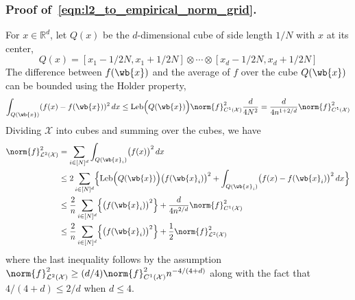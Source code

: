 \documentclass{article}
\newcommand{\Reals}{\mathbb{R}}
\newcommand{\1}{\mathbf{1}}
\newcommand{\Rd}{\Reals^d}
\newcommand{\Xset}{\mathcal{X}}
\newcommand{\Leb}{\mathcal{L}}
\theoremstyle{alden}
\theoremstyle{aldenthm}
\theoremstyle{definition}
\theoremstyle{remark}
\begin{document}
\subsubsection{Proof of~\eqref{eqn:l2_to_empirical_norm_grid}.}
For $x \in \Rd$, let $Q(x)$ be the $d$-dimensional cube of side length $1/N$ with $x$ at its center,
\begin{equation*}
Q(x) = [x_1 - 1/2N,x_1 + 1/2N] \otimes \cdots \otimes [x_d - 1/2N,x_d + 1/2N]
\end{equation*}
The difference between $f(\wb{x})$ and the average of $f$ over the cube $Q(\wb{x})$ can be bounded using the Holder property,
\begin{equation*}
\int_{Q(\wb{x})} (f(x) - f(\wb{x}))^2 \,dx \leq \mathrm{Leb}\Bigl(Q(\wb{x})\Bigr) \norm{f}_{C^1(\Xset)}^2 \frac{d}{4N^2} = \frac{d}{4n^{1 + 2/d}} \norm{f}_{C^1(\Xset)}^2
\end{equation*}
Dividing $\Xset$ into cubes and summing over the cubes, we have
\begin{align*}
\norm{f}_{\Leb^2(\Xset)}^2 & = \sum_{i \in [N]^d} \int_{Q(\wb{x}_i)} \bigl(f(x)\bigr)^2 \,dx \\
& \leq 2 \sum_{i \in [N]^d} \Bigl\{\mathrm{Leb}\Bigl(Q(\wb{x})\Bigr) \bigl(f(\wb{x}_i)\bigr)^2 + \int_{Q(\wb{x}_i)} \bigl(f(x) - f(\wb{x}_i)\bigr)^2 \,dx \Bigr\} \\
& \leq \frac{2}{n}\sum_{i \in [N]^d} \Bigl\{ \bigl(f(\wb{x}_i)\bigr)^2\Bigr\} + \frac{d}{4n^{2/d}} \norm{f}_{C^1(\Xset)}^2 \\
& \leq \frac{2}{n}\sum_{i \in [N]^d} \Bigl\{ \bigl(f(\wb{x}_i)\bigr)^2\Bigr\} + \frac{1}{2}\norm{f}_{\Leb^2(\Xset)}^2
\end{align*}
where the last inequality follows by the assumption $\norm{f}_{\Leb^2(\Xset)}^2 \geq (d/4) \norm{f}_{C^1(\Xset)}^2 n^{-4/(4 + d)}$ along with the fact that $4/(4 + d) \leq 2/d$ when $d \leq 4$.
\end{document}
